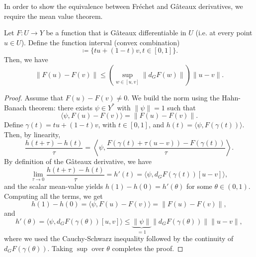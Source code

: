 In order to show the equivalence between Fréchet and Gâteaux derivatives, we require the mean value theorem. 
\begin{theorem}\label{thm:mean-value-banach}
    Let $F:U\to Y$ be a function that is Gâteaux differentiable in $U$ (i.e. at every point $u\in U$). Define the function interval (convex combination)
    \begin{equation}
        [u,v] \coloneqq \{tu+(1-t)v, t\in[0,1]\}.
    \end{equation}
    Then, we have
    \begin{equation}
        \|F(u)-F(v)\| \leq \left(\sup_{w\in[u,v]} \|d_G F(w)\|\right) \|u-v\|. 
    \end{equation}
    \begin{proof}
        Assume that $F(u)-F(v)\neq 0$. We build the norm using the Hahn-Banach theorem: there exists $\psi \in Y^*$ with $\|\psi\|=1$ such that 
        \begin{equation*}
            \langle \psi, F(u)-F(v)\rangle = \|F(u)-F(v)\|. 
        \end{equation*}    
        Define $\gamma(t) = tu + (1-t)v$, with $t\in [0,1]$, and $h(t)=\langle \psi, F(\gamma(t))\rangle$. Then, by linearity, 
        \begin{equation*}
            \frac{h(t+\tau) - h(t)}{\tau} = \left\langle \psi, \frac{F(\gamma(t) + \tau(u-v)) - F(\gamma(t))}{\tau} \right\rangle.
        \end{equation*}
        By definition of the Gâteaux derivative, we have
        \begin{equation*}
            \lim_{\tau\to 0} \frac{h(t+\tau) - h(t)}{\tau} = h'(t) = \langle \psi, d_G F(\gamma(t)) [u-v]\rangle, 
        \end{equation*}
        and the scalar mean-value yields $h(1)-h(0) = h'(\theta)$ for some $\theta\in(0,1)$. Computing all the terms, we get
        \begin{equation*}
            h(1)-h(0) = \langle \psi, F(u)-F(v)\rangle = \|F(u)-F(v)\|,
        \end{equation*}
        and 
        \begin{equation*}
            h'(\theta) = \langle \psi, d_G F(\gamma(\theta))[u,v]\rangle \leq \underbrace{\|\psi\|}_{=1} \|d_G F(\gamma(\theta))\| \|u-v\|,
        \end{equation*}
        where we used the Cauchy-Schwarz inequality followed by the continuity of $d_G F(\gamma(\theta))$. Taking $\sup$ over $\theta$ completes the proof. 
    \end{proof}
\end{theorem}

